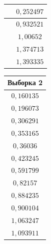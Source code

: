 \begin{table}[h]
\begin{minipage}[h]{0.49\linewidth}
\begin{center}
\begin{tabular}{|c|}
          $\phantom{-}0{,}252497$ \\
          \hline 
        
          $\phantom{-}0{,}932521$ \\
          \hline 
        
          $\phantom{-}1{,}00652$ \\
          \hline 
        
          $\phantom{-}1{,}374713$ \\
          \hline 
        
          $\phantom{-}1{,}393335$ \\
          \hline 
        
      \end{tabular}
      \hspace*{1em}
      \begin{tabular}{|c|}
        \hline
        Выборка 2 \\
        \hline 
        
          $0{,}160135$ \\
          \hline 
        
          $0{,}196073$ \\
          \hline 
        
          $0{,}306291$ \\
          \hline 
        
          $0{,}353165$ \\
          \hline 
        
          $0{,}36036$ \\
          \hline 
        
          $0{,}423245$ \\
          \hline 
        
          $0{,}591799$ \\
          \hline 
        
          $0{,}82157$ \\
          \hline 
        
          $0{,}884235$ \\
          \hline 
        
          $0{,}900104$ \\
          \hline 
        
          $1{,}063247$ \\
          \hline 
        
          $1{,}093911$ \\
          \hline 
        

\end{tabular}
\end{center}
\end{minipage}
\end{table}
